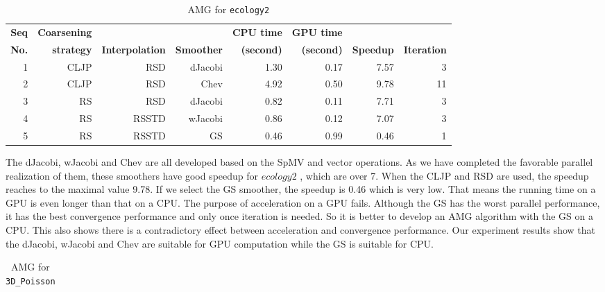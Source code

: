\documentclass[runningheads,a4paper]{llncs}
\begin{document}
{\begin{table}\caption{AMG for \texttt{ecology2}}
\begin{tabular}{|r|r|r|r|r|r|r|r|} \hline

\bfseries Seq & \bfseries Coarsening & \bfseries               & \bfseries          & \bfseries CPU time & \bfseries GPU time & \bfseries         & \bfseries           \\
\bfseries No. & \bfseries strategy   & \bfseries Interpolation & \bfseries Smoother & \bfseries (second) & \bfseries (second) & \bfseries Speedup & \bfseries Iteration \\ \hline
1	          &CLJP	       &RSD	    &dJacobi	    &1.30	       &0.17	       &7.57	   &3\\ \hline
2	          &CLJP	       &RSD	    &Chev	        &4.92	       &0.50	       &9.78	   &11\\ \hline
3	          &RS	       &RSD	    &dJacobi	    &0.82	       &0.11	       &7.71	   &3\\ \hline
4	          &RS	       &RSSTD	 &wJacobi	    &0.86	       &0.12	       &7.07	   &3\\ \hline
5	          &RS	       &RSSTD	 &GS	        &0.46	       &0.99	       &0.46	   &1\\ \hline
\end{tabular}
\label{tbl_amg_ecology2}
\end{table}

The dJacobi, wJacobi and Chev are all developed based on the SpMV and vector operations. As we have completed the favorable parallel realization of them, these smoothers have good speedup for $ecology2$ , which are over 7. When the CLJP and RSD are used, the speedup reaches to the maximal value 9.78. If we select the GS smoother, the speedup is 0.46 which is very low. That means the running time on a GPU is even longer than that on a CPU. The purpose of acceleration on a GPU fails. Although the GS has the worst parallel performance, it has the best convergence performance and only once iteration is needed. So it is better to develop an AMG algorithm with the GS on a CPU. This also shows there is a contradictory effect between acceleration and convergence performance. Our experiment results show that the dJacobi, wJacobi and Chev are suitable for GPU computation while the GS is suitable for CPU.

\begin{table}\caption{AMG for \texttt{3D\_Poisson}}
\begin{tabular}{|r|r|r|r|r|r|r|r|} \hline


\end{tabular}
\end{table}}
\end{document}
